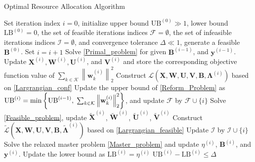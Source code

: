 \documentclass[12pt, draftclsnofoot, onecolumn]{IEEEtran}
\begin{document}
\begin{algorithm}[t]
\caption{Optimal Resource Allocation Algorithm}
\begin{algorithmic}[1]
\small
\STATE Set iteration index $i=0$, initialize upper bound $\mathrm{UB}^{(0)}\gg 1$, lower bound $\mathrm{LB}^{(0)}=0$, the set of feasible iterations indices $\mathcal{F}=\emptyset$, the set of infeasible iterations indices $\mathcal{I}=\emptyset$, and convergence tolerance $\Delta\ll 1$, generate a feasible $\mathbf{B}^{(0)}$.
\REPEAT
\STATE Set $i=i+1$
\STATE Solve \eqref{Primal_problem} for given $\mathbf{B}^{(i-1)}$, and $\mathbf{y}^{(i-1)}$.
\STATE Update $\mathbf{X}^{(i)},\mathbf{W}^{(i)},\mathbf{U}^{(i)}$, and $\mathbf{V}^{(i)}$ and store the corresponding objective function value of $\sum_{k\in\mathcal{K}}\left\|\mathbf{w}_k^{(i)}\right\|_2^2$
\STATE Construct $\mathcal{L}(\mathbf{X},\mathbf{W},\mathbf{U},\mathbf{V},\mathbf{B},\bm{\Lambda}^{(i)})$ based on \eqref{Largrangian_conf}
\STATE Update the upper bound of \eqref{Reform_Problem} as $\mathrm{UB}^{(i)}=\min\left\{\mathrm{UB}^{(i-1)},\hspace*{1mm}\sum_{k\in\mathcal{K}}\left\|\mathbf{w}_k^{(i)}\right\|_2^2\right\}$, and update $\mathcal{F}$ by $\mathcal{F}\cup\{i\}$ %
\ELSE
\STATE Solve \eqref{Feasible_problem}, update $\widetilde{\mathbf{X}}^{(i)}$, $\widetilde{\mathbf{W}}^{(i)}$, $\widetilde{\mathbf{U}}^{(i)}$, $\widetilde{\mathbf{V}}^{(i)}$
\STATE Construct $\widetilde{\mathcal{L}}(\mathbf{X},\mathbf{W},\mathbf{U},\mathbf{V},\mathbf{B},\widetilde{\bm{\Lambda}}^{(i)})$ based on \eqref{Largrangian_feasible}
\STATE Update $\mathcal{I}$ by $\mathcal{I}\cup\{i\}$ %
\ENDIF
\STATE Solve the relaxed master problem \eqref{Master_problem} and update $\eta^{(i)}$, $\mathbf{B}^{(i)}$, and $\mathbf{y}^{(i)}$.
\STATE Update the lower bound as $\mathrm{LB}^{(i)}=\eta^{(i)}$
\UNTIL $\mathrm{UB}^{(i)}-\mathrm{LB}^{(i)}\leq \Delta$
\end{algorithmic}
\end{algorithm}
\end{document}
